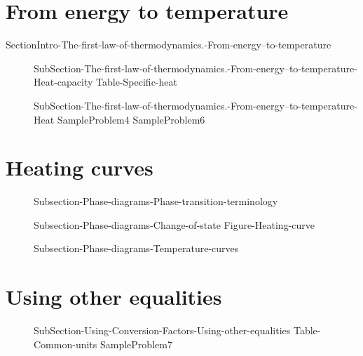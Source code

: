 \documentclass[main.tex]{subfiles}
\newcommand\chapterlabel{ChMIX-statesofmatter}\setcounter{figurenewcounter}{0}\setcounter{tablenewcounter}{0}\setcounter{formulanewcounter}{0}
\begin{document}
\section{\faFire From energy  to temperature}
{SectionIntro-The-first-law-of-thermodynamics.-From-energy--to-temperature}
\sloppy\begin{description}
\item[] 
  {SubSection-The-first-law-of-thermodynamics.-From-energy--to-temperature-Heat-capacity}
   {Table-Specific-heat}
\item[] 
  {SubSection-The-first-law-of-thermodynamics.-From-energy--to-temperature-Heat}
   {SampleProblem4}
      {SampleProblem6}
 \end{description}




\renewcommand\chapterlabel{Ch-solids}
\section{\faFire Heating curves}
\sloppy\begin{description}
\item[]{Subsection-Phase-diagrams-Phase-transition-terminology}
\item[] {Subsection-Phase-diagrams-Change-of-state}
{Figure-Heating-curve}
\item[] {Subsection-Phase-diagrams-Temperature-curves}
\end{description}

\renewcommand\chapterlabel{Ch-measurements}
\section{\faGears Using other equalities}
\sloppy\begin{description}
\item[]{SubSection-Using-Conversion-Factors-Using-other-equalities}
{Table-Common-units}
{SampleProblem7}
\end{description}


\end{document}
